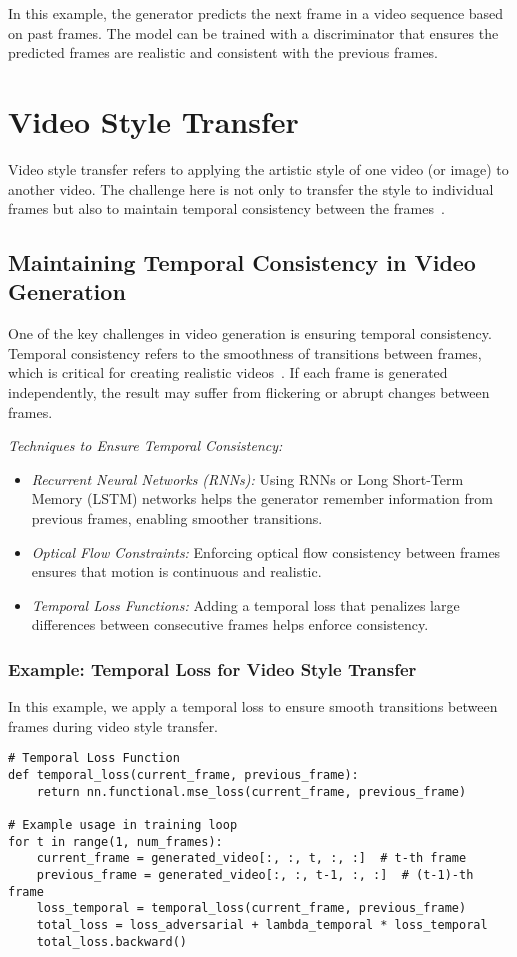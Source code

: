 In this example, the generator predicts the next frame in a video sequence based on past frames. The model can be trained with a discriminator that ensures the predicted frames are realistic and consistent with the previous frames.

\section{Video Style Transfer}
Video style transfer refers to applying the artistic style of one video (or image) to another video. The challenge here is not only to transfer the style to individual frames but also to maintain temporal consistency between the frames~\cite{aldausari2022video}.

\subsection{Maintaining Temporal Consistency in Video Generation}
One of the key challenges in video generation is ensuring temporal consistency. Temporal consistency refers to the smoothness of transitions between frames, which is critical for creating realistic videos~\cite{li2024survey}. If each frame is generated independently, the result may suffer from flickering or abrupt changes between frames.

\textit{Techniques to Ensure Temporal Consistency:}
\begin{itemize}
    \item \textit{Recurrent Neural Networks (RNNs):} Using RNNs or Long Short-Term Memory (LSTM) networks helps the generator remember information from previous frames, enabling smoother transitions.
    \item \textit{Optical Flow Constraints:} Enforcing optical flow consistency between frames ensures that motion is continuous and realistic.
    \item \textit{Temporal Loss Functions:} Adding a temporal loss that penalizes large differences between consecutive frames helps enforce consistency.
\end{itemize}

\subsubsection{Example: Temporal Loss for Video Style Transfer}
In this example, we apply a temporal loss to ensure smooth transitions between frames during video style transfer.

\begin{lstlisting}[style=python]
# Temporal Loss Function
def temporal_loss(current_frame, previous_frame):
    return nn.functional.mse_loss(current_frame, previous_frame)

# Example usage in training loop
for t in range(1, num_frames):
    current_frame = generated_video[:, :, t, :, :]  # t-th frame
    previous_frame = generated_video[:, :, t-1, :, :]  # (t-1)-th frame
    loss_temporal = temporal_loss(current_frame, previous_frame)
    total_loss = loss_adversarial + lambda_temporal * loss_temporal
    total_loss.backward()
\end{lstlisting}

